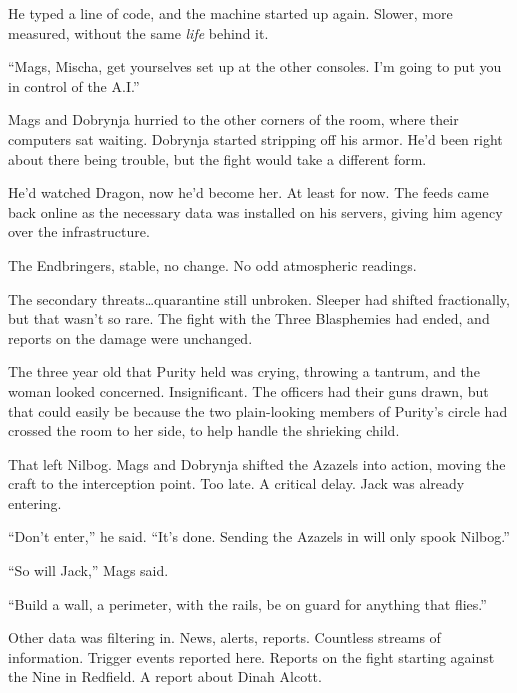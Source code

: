 He typed a line of code, and the machine started up again.  Slower, more measured, without the same \emph{life} behind it.



``Mags, Mischa, get yourselves set up at the other consoles.  I'm going to put you in control of the A.I.''



Mags and Dobrynja hurried to the other corners of the room, where their computers sat waiting.  Dobrynja started stripping off his armor.  He'd been right about there being trouble, but the fight would take a different form.



He'd watched Dragon, now he'd become her.  At least for now.  The feeds came back online as the necessary data was installed on his servers, giving him agency over the infrastructure.



The Endbringers, stable, no change.  No odd atmospheric readings.



The secondary threats\ldots quarantine still unbroken.  Sleeper had shifted fractionally, but that wasn't so rare.  The fight with the Three Blasphemies had ended, and reports on the damage were unchanged.



The three year old that Purity held was crying, throwing a tantrum, and the woman looked concerned.  Insignificant.  The officers had their guns drawn, but that could easily be because the two plain-looking members of Purity's circle had crossed the room to her side, to help handle the shrieking child.



That left Nilbog.  Mags and Dobrynja shifted the Azazels into action, moving the craft to the interception point.  Too late.  A critical delay.  Jack was already entering.



``Don't enter,'' he said.  ``It's done.  Sending the Azazels in will only spook Nilbog.''



``So will Jack,'' Mags said.



``Build a wall, a perimeter, with the rails, be on guard for anything that flies.''



Other data was filtering in.  News, alerts, reports.  Countless streams of information.  Trigger events reported here.  Reports on the fight starting against the Nine in Redfield.  A report about Dinah Alcott.



